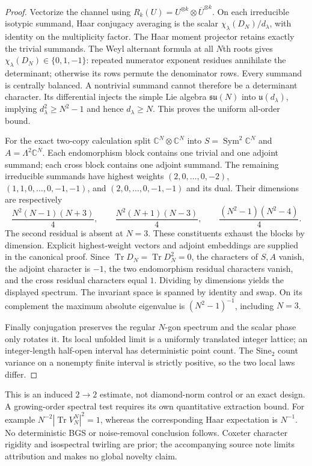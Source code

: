 \begin{proof}
Vectorize the channel using $R_k(U)=U^{\otimes k}\otimes\overline U^{\otimes k}$.
On each irreducible isotypic summand, Haar conjugacy averaging is the scalar
$\chi_\lambda(D_N)/d_\lambda$, with identity on the multiplicity factor.
The Haar moment projector retains exactly the trivial summands.
The Weyl alternant formula at all $N$th roots gives
$\chi_\lambda(D_N)\in\{0,1,-1\}$: repeated numerator exponent residues
annihilate the determinant; otherwise its rows permute the denominator rows.
Every summand is centrally balanced. A nontrivial summand cannot therefore
be a determinant character. Its differential injects the simple Lie algebra
$\mathfrak{su}(N)$ into $\mathfrak u(d_\lambda)$, implying
$d_\lambda^2\ge N^2-1$ and hence $d_\lambda\ge N$. This proves the uniform
all-order bound.

For the exact two-copy calculation split $\mathbb C^N\otimes\mathbb C^N$
into $S=\operatorname{Sym}^2\mathbb C^N$ and $A=\Lambda^2\mathbb C^N$.
Each endomorphism block contains one trivial and one adjoint summand; each
cross block contains one adjoint summand. The remaining irreducible
summands have highest weights $(2,0,\ldots,0,-2)$,
$(1,1,0,\ldots,0,-1,-1)$, and $(2,0,\ldots,0,-1,-1)$ and its dual.
Their dimensions are respectively
\[
\frac{N^2(N-1)(N+3)}4,\qquad
\frac{N^2(N+1)(N-3)}4,\qquad
\frac{(N^2-1)(N^2-4)}4.
\]
The second residual is absent at $N=3$. These constituents exhaust the
blocks by dimension. Explicit highest-weight vectors and adjoint embeddings
are supplied in the canonical proof.
Since $\operatorname{Tr}D_N=\operatorname{Tr}D_N^2=0$, the characters of
$S,A$ vanish, the adjoint character is $-1$, the two endomorphism residual
characters vanish, and the cross residual characters equal $1$. Dividing by
dimensions yields the displayed spectrum. The invariant space is spanned by
identity and swap. On its complement the maximum absolute eigenvalue is
$(N^2-1)^{-1}$, including $N=3$.

Finally conjugation preserves the regular $N$-gon spectrum and the scalar
phase only rotates it. Its local unfolded limit is a uniformly translated
integer lattice; an integer-length half-open interval has deterministic
point count. The Sine$_2$ count variance on a nonempty finite interval is
strictly positive, so the two local laws differ.
\end{proof}

This is an induced $2\to2$ estimate, not diamond-norm control or an exact
design. A growing-order spectral test requires its own quantitative
extraction bound. For example $N^{-2}|\operatorname{Tr}V_N^N|^2=1$, whereas
the corresponding Haar expectation is $N^{-1}$. No deterministic BGS or
noise-removal conclusion follows. Coxeter character rigidity and isospectral
twirling are prior; the accompanying source note limits attribution and
makes no global novelty claim.
